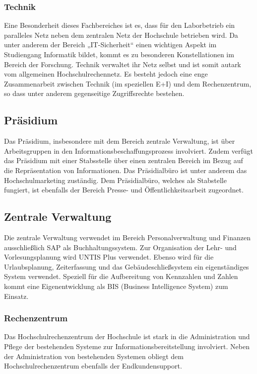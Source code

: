 \subsubsection{Technik}
Eine Besonderheit dieses Fachbereiches ist es, dass für den Laborbetrieb ein paralleles Netz neben dem zentralen Netz der Hochschule betrieben wird. Da unter anderem der Bereich „IT-Sicherheit“ einen wichtigen Aspekt im Studiengang Informatik bildet, kommt es zu besonderen Konstellationen im Bereich der Forschung. Technik verwaltet ihr Netz selbst und ist somit autark vom allgemeinen Hochschulrechennetz. Es besteht jedoch eine enge Zusammenarbeit zwischen Technik (im speziellen E+I) und dem Rechenzentrum, so dass unter anderem gegenseitige Zugriffsrechte bestehen. 

\subsection{Präsidium}
\label{praesidium_label}

Das Präsidium, insbesondere mit dem Bereich zentrale Verwaltung, ist über  Arbeitsgruppen in den Informationsbeschaffungsprozess involviert. Zudem verfügt das Präsidium mit einer Stabsstelle über einen zentralen Bereich im Bezug auf die Repräsentation von Informationen.  Das Präsidialbüro ist unter anderem das Hochschulmarketing zuständig. Dem Präsidialbüro, welches als Stabstelle fungiert, ist ebenfalls der Bereich Presse- und Öffentlichkeitsarbeit zugeordnet. 

\subsection{Zentrale Verwaltung}
Die zentrale Verwaltung verwendet im Bereich Personalverwaltung und Finanzen ausschließlich SAP als Buchhaltungssystem. Zur Organisation der Lehr- und Vorlesungsplanung wird UNTIS Plus verwendet. Ebenso wird für die Urlaubsplanung, Zeiterfassung und das Gebäudeschließsystem ein eigenständiges System verwendet. Speziell für die Aufbereitung von Kennzahlen und Zahlen kommt eine Eigenentwicklung als BIS (Business Intelligence System) zum Einsatz. 

\subsubsection{Rechenzentrum}
Das Hochschulrechenzentrum der Hochschule ist stark in die Administration und Pflege der bestehenden Systeme zur Informationsbereitstellung involviert. Neben der Administration von bestehenden Systemen obliegt dem Hochschulrechenzentrum ebenfalls der Endkundensupport.

